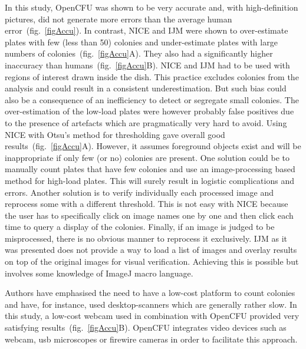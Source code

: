 \documentclass[10pt]{article}
\newcommand{\IJM}{IJM}
\begin{document}
In this study, OpenCFU was shown to be very accurate and, with high-definition
pictures, did not generate more errors than the average human error~(fig.~\ref{figAccu}). In contrast, NICE and \IJM{} 
were
shown to
over-estimate plates with few (less than 50) colonies and under-estimate plates
with large numbers 
of colonies~(fig.~\ref{figAccu}A). They also had a significantly
higher inaccuracy than humans~(fig.~\ref{figAccu}B). NICE and \IJM{} had to be
used with regions of interest drawn inside the dish. This practice excludes
colonies from the analysis and could result in a
consistent underestimation. But such bias could also be a consequence of an inefficiency to detect or segregate
 small colonies.
The over-estimation of the low-load plates were however probably false positives
due to the presence of artefacts which are pragmatically very hard to avoid.
Using NICE with Otsu's method for thresholding gave overall good results~(fig.~\ref{figAccu}A).
However, it assumes foreground objects exist and will be inappropriate
if only few (or no) colonies are present. One
solution could be to manually count plates that have few colonies and use an
image-processing based method for high-load plates. This will surely result in
logistic complications and errors. Another solution is to verify individually
each processed image and reprocess some with a different threshold.
This is not easy with NICE because the user has to specifically click on image
names one by one and then click each time to query a display of the colonies.
Finally, if an image is judged to be misprocessed, there is no obvious manner to
reprocess it exclusively.
\IJM{} as it was presented
does not provide a way to load a list of images and
overlay results on top of the original images for visual verification. Achieving
this is possible but involves some knowledge of ImageJ macro language.


Authors have emphasised the need to have a low-cost platform to count colonies
and have, for instance, used
desktop-scanners\cite{marotz_effective_2001,putman_simplified_2005,clarke_lowcost_2010,cai_optimized_2011
} which are generally rather slow. In this study, a low-cost webcam used in
combination with OpenCFU provided very satisfying results~(fig.~\ref{figAccu}B). OpenCFU integrates
video devices such as webcam, usb microscopes or firewire cameras in order to
facilitate this approach.
\end{document}
